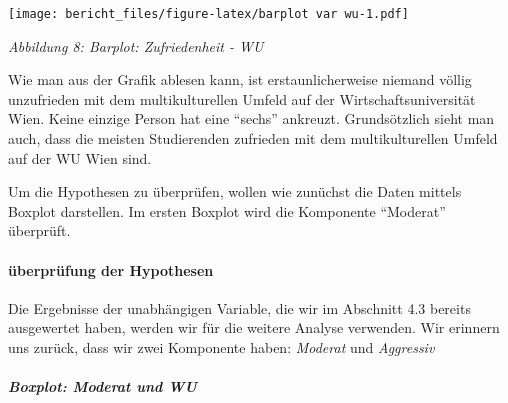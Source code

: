 \documentclass[]{article}
\newenvironment{Shaded}{\begin{snugshade}}{\end{snugshade}}
\newcommand{\KeywordTok}[1]{\textcolor[rgb]{0.13,0.29,0.53}{\textbf{{#1}}}}
\newcommand{\DataTypeTok}[1]{\textcolor[rgb]{0.13,0.29,0.53}{{#1}}}
\newcommand{\DecValTok}[1]{\textcolor[rgb]{0.00,0.00,0.81}{{#1}}}
\newcommand{\StringTok}[1]{\textcolor[rgb]{0.31,0.60,0.02}{{#1}}}
\newcommand{\NormalTok}[1]{{#1}}
\let\oldparagraph\paragraph
\renewcommand{\paragraph}[1]{\oldparagraph{#1}\mbox{}}
\let\oldsubparagraph\subparagraph
\renewcommand{\subparagraph}[1]{\oldsubparagraph{#1}\mbox{}}
\begin{document}
\begin{Shaded}
\end{Shaded}

\texttt{[image: bericht\_files/figure-latex/barplot var wu-1.pdf]}

\begin{center}
\textit{Abbildung 8: Barplot: Zufriedenheit - WU}
\bigskip
\end{center}

Wie man aus der Grafik ablesen kann, ist erstaunlicherweise niemand
völlig unzufrieden mit dem multikulturellen Umfeld auf der
Wirtschaftsuniversität Wien. Keine einzige Person hat eine ``sechs''
ankreuzt. Grundsötzlich sieht man auch, dass die meisten Studierenden
zufrieden mit dem multikulturellen Umfeld auf der WU Wien sind.

Um die Hypothesen zu überprüfen, wollen wie zunüchst die Daten mittels
Boxplot darstellen. Im ersten Boxplot wird die Komponente ``Moderat''
überprüft.

\paragraph{überprüfung der
Hypothesen}\label{uberprufung-der-hypothesen-1}

Die Ergebnisse der unabhängigen Variable, die wir im Abschnitt 4.3
bereits ausgewertet haben, werden wir für die weitere Analyse verwenden.
Wir erinnern uns zurück, dass wir zwei Komponente haben: \emph{Moderat}
und \emph{Aggressiv}

\subparagraph{Boxplot: Moderat und WU}\label{boxplot-moderat-und-wu}
\end{document}
